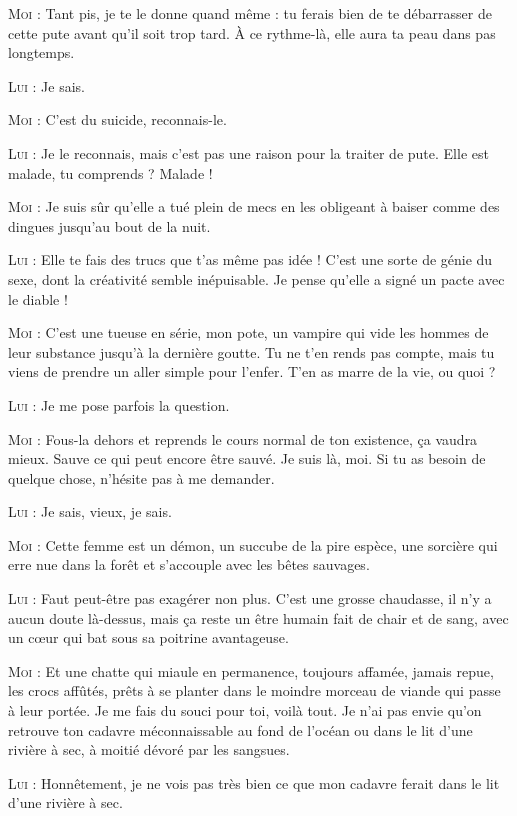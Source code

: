\begin{dialogue}
\textsc{Moi} : Tant pis, je te le donne quand même : tu ferais bien de te débarrasser de cette pute avant qu’il soit trop tard. À ce rythme-là, elle aura ta peau dans pas longtemps.

\textsc{Lui} : Je sais.

\textsc{Moi} : C’est du suicide, reconnais-le.

\textsc{Lui} : Je le reconnais, mais c’est pas une raison pour la traiter de pute. Elle est malade, tu comprends ? Malade !

\textsc{Moi} : Je suis sûr qu’elle a tué plein de mecs en les obligeant à baiser comme des dingues jusqu’au bout de la nuit.

\textsc{Lui} : Elle te fais des trucs que t’as même pas idée ! C’est une sorte de génie du sexe, dont la créativité semble inépuisable. Je pense qu’elle a signé un pacte avec le diable !

\textsc{Moi} : C’est une tueuse en série, mon pote, un vampire qui vide les hommes de leur substance jusqu’à la dernière goutte. Tu ne t’en rends pas compte, mais tu viens de prendre un aller simple pour l’enfer. T’en as marre de la vie, ou quoi ?

\textsc{Lui} : Je me pose parfois la question.

\textsc{Moi} : Fous-la dehors et reprends le cours normal de ton existence, ça vaudra mieux. Sauve ce qui peut encore être sauvé. Je suis là, moi. Si tu as besoin de quelque chose, n’hésite pas à me demander.

\textsc{Lui} : Je sais, vieux, je sais.

\textsc{Moi} : Cette femme est un démon, un succube de la pire espèce, une sorcière qui erre nue dans la forêt et s’accouple avec les bêtes sauvages.

\textsc{Lui} : Faut peut-être pas exagérer non plus. C’est une grosse chaudasse, il n’y a aucun doute là-dessus, mais ça reste un être humain fait de chair et de sang, avec un cœur qui bat sous sa poitrine avantageuse.

\textsc{Moi} : Et une chatte qui miaule en permanence, toujours affamée, jamais repue, les crocs affûtés, prêts à se planter dans le moindre morceau de viande qui passe à leur portée. Je me fais du souci pour toi, voilà tout. Je n’ai pas envie qu’on retrouve ton cadavre méconnaissable au fond de l’océan ou dans le lit d’une rivière à sec, à moitié dévoré par les sangsues.

\textsc{Lui} : Honnêtement, je ne vois pas très bien ce que mon cadavre ferait dans le lit d’une rivière à sec.


\end{dialogue}
